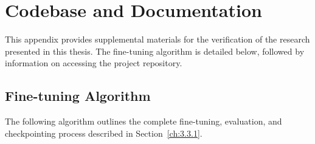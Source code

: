 \chapter{Codebase and Documentation}\label{app:codebase}

This appendix provides supplemental materials for the verification of the research presented in this thesis. The fine-tuning algorithm is detailed below, followed by information on accessing the project repository.

\section{Fine-tuning Algorithm}\label{app:finetune}
The following algorithm outlines the complete fine-tuning, evaluation, and checkpointing process described in Section~\ref{ch:3.3.1}.

